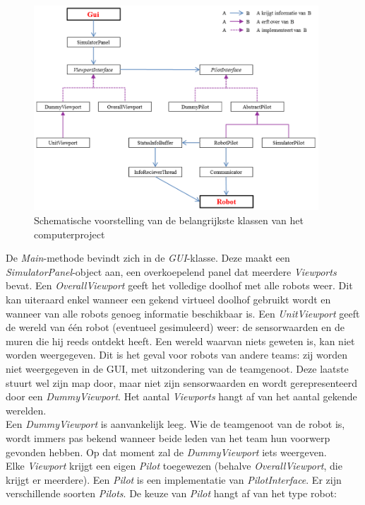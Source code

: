 \documentclass[eind]{penoverslag}
\begin{document}
\begin{figure}[h]
\centering
		\includegraphics[width=0.95\textwidth]{KlasSoftware}
\caption[Structuur van computerproject]{Schematische voorstelling van de belangrijkste klassen van het computerproject}
\label{fig:klasSoft}
\end{figure}

De \textit{Main}-methode bevindt zich in de \textit{GUI}-klasse. Deze maakt een \textit{SimulatorPanel}-object aan, een overkoepelend panel dat meerdere \textit{Viewports} bevat. Een \textit{OverallViewport} geeft het volledige doolhof met alle robots weer. Dit kan uiteraard enkel wanneer een gekend virtueel doolhof gebruikt wordt en wanneer van alle robots genoeg informatie beschikbaar is. Een \textit{UnitViewport} geeft de wereld van \'e\'en robot (eventueel gesimuleerd) weer: de sensorwaarden en de muren die hij reeds ontdekt heeft. Een wereld waarvan niets geweten is, kan niet worden weergegeven. Dit is het geval voor robots van andere teams: zij worden niet weergegeven in de GUI, met uitzondering van de teamgenoot. Deze laatste stuurt wel zijn map door, maar niet zijn sensorwaarden en wordt gerepresenteerd door een \textit{DummyViewport}. Het aantal \textit{Viewports} hangt af van het aantal gekende werelden.\\

Een \textit{DummyViewport} is aanvankelijk leeg. Wie de teamgenoot van de robot is, wordt immers pas bekend wanneer beide leden van het team hun voorwerp gevonden hebben. Op dat moment zal de \textit{DummyViewport} iets weergeven.\\

Elke \textit{Viewport} krijgt een eigen \textit{Pilot} toegewezen (behalve \textit{OverallViewport}, die krijgt er meerdere). Een \textit{Pilot} is een implementatie van \textit{PilotInterface}. Er zijn verschillende soorten \textit{Pilots}. De keuze van \textit{Pilot} hangt af van het type robot:
\end{document}
